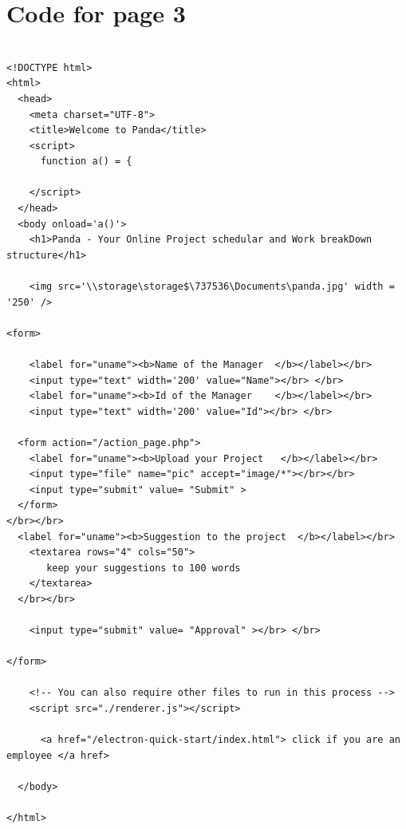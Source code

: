 \documentclass{article}
\begin{document}
\section *{Code for page 3}
\begin{verbatim}

<!DOCTYPE html>
<html>
  <head>
    <meta charset="UTF-8">
    <title>Welcome to Panda</title>
    <script>
      function a() = {

    </script>
  </head>
  <body onload='a()'>
    <h1>Panda - Your Online Project schedular and Work breakDown structure</h1>
    
    <img src='\\storage\storage$\737536\Documents\panda.jpg' width = '250' />
    
<form>
    
    <label for="uname"><b>Name of the Manager  </b></label></br>
    <input type="text" width='200' value="Name"></br> </br>
    <label for="uname"><b>Id of the Manager    </b></label></br>
    <input type="text" width='200' value="Id"></br> </br>

  <form action="/action_page.php">
    <label for="uname"><b>Upload your Project   </b></label></br>
    <input type="file" name="pic" accept="image/*"></br></br>
    <input type="submit" value= "Submit" >
  </form>
</br></br>
  <label for="uname"><b>Suggestion to the project  </b></label></br>
    <textarea rows="4" cols="50">
       keep your suggestions to 100 words
    </textarea>
  </br></br>

    <input type="submit" value= "Approval" ></br> </br>
  
</form>

    <!-- You can also require other files to run in this process -->
    <script src="./renderer.js"></script>
   
      <a href="/electron-quick-start/index.html"> click if you are an employee </a href>
        
  </body>
  
</html>



\end{verbatim}
\end{document}
